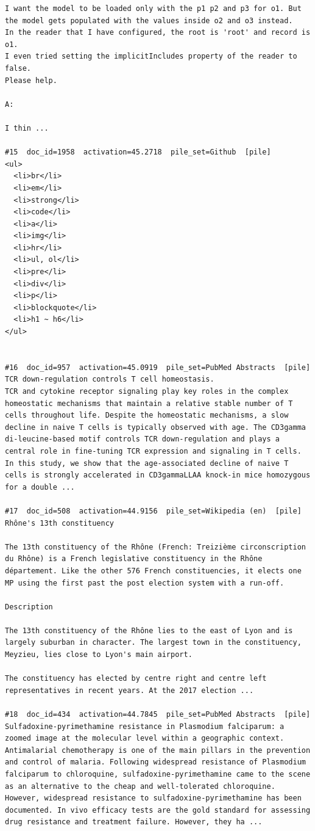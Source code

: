 \begin{verbatim}
I want the model to be loaded only with the p1 p2 and p3 for o1. But the model gets populated with the values inside o2 and o3 instead.
In the reader that I have configured, the root is 'root' and record is o1.
I even tried setting the implicitIncludes property of the reader to false.
Please help.

A:

I thin ...

#15  doc_id=1958  activation=45.2718  pile_set=Github  [pile]
<ul>
  <li>br</li>
  <li>em</li>
  <li>strong</li>
  <li>code</li>
  <li>a</li>
  <li>img</li>
  <li>hr</li>
  <li>ul, ol</li>
  <li>pre</li>
  <li>div</li>
  <li>p</li>
  <li>blockquote</li>
  <li>h1 ~ h6</li>
</ul>


#16  doc_id=957  activation=45.0919  pile_set=PubMed Abstracts  [pile]
TCR down-regulation controls T cell homeostasis.
TCR and cytokine receptor signaling play key roles in the complex homeostatic mechanisms that maintain a relative stable number of T cells throughout life. Despite the homeostatic mechanisms, a slow decline in naive T cells is typically observed with age. The CD3gamma di-leucine-based motif controls TCR down-regulation and plays a central role in fine-tuning TCR expression and signaling in T cells. In this study, we show that the age-associated decline of naive T cells is strongly accelerated in CD3gammaLLAA knock-in mice homozygous for a double ...

#17  doc_id=508  activation=44.9156  pile_set=Wikipedia (en)  [pile]
Rhône's 13th constituency

The 13th constituency of the Rhône (French: Treizième circonscription du Rhône) is a French legislative constituency in the Rhône département. Like the other 576 French constituencies, it elects one MP using the first past the post election system with a run-off.

Description

The 13th constituency of the Rhône lies to the east of Lyon and is largely suburban in character. The largest town in the constituency, Meyzieu, lies close to Lyon's main airport.

The constituency has elected by centre right and centre left representatives in recent years. At the 2017 election ...

#18  doc_id=434  activation=44.7845  pile_set=PubMed Abstracts  [pile]
Sulfadoxine-pyrimethamine resistance in Plasmodium falciparum: a zoomed image at the molecular level within a geographic context.
Antimalarial chemotherapy is one of the main pillars in the prevention and control of malaria. Following widespread resistance of Plasmodium falciparum to chloroquine, sulfadoxine-pyrimethamine came to the scene as an alternative to the cheap and well-tolerated chloroquine. However, widespread resistance to sulfadoxine-pyrimethamine has been documented. In vivo efficacy tests are the gold standard for assessing drug resistance and treatment failure. However, they ha ...


\end{verbatim}
